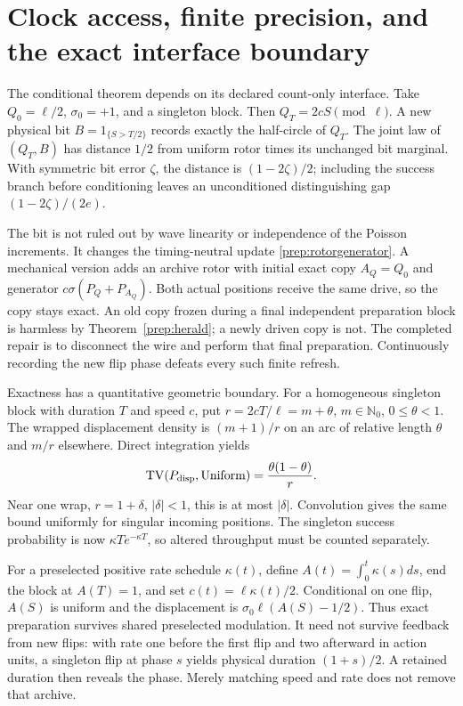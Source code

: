 \documentclass[11pt,oneside,openany]{book}
\theoremstyle{definition}
\theoremstyle{remark}\newtheorem{remark}[theorem]{Remark}
\begin{document}
\section{Clock access, finite precision, and the exact interface boundary}

The conditional theorem depends on its declared count-only interface.
Take $Q_0=\ell/2$, $\sigma_0=+1$, and a singleton block. Then
$Q_T=2cS\pmod\ell$. A new physical bit
$B=1_{\{S>T/2\}}$ records exactly the half-circle of $Q_T$.
The joint law of $(Q_T,B)$ has distance $1/2$ from uniform rotor
times its unchanged bit marginal. With symmetric bit error $\zeta$,
the distance is $(1-2\zeta)/2$; including the success branch before
conditioning leaves an unconditioned distinguishing gap
$(1-2\zeta)/(2e)$.

The bit is not ruled out by wave linearity or independence of the Poisson
increments. It changes the timing-neutral update
\eqref{prep:rotorgenerator}. A mechanical version adds an archive rotor
with initial exact copy $A_Q=Q_0$ and generator
$c\sigma(P_Q+P_{A_Q})$. Both actual positions receive the same drive,
so the copy stays exact. An old copy frozen during a final independent
preparation block is harmless by Theorem~\ref{prep:herald}; a newly driven
copy is not. The completed repair is to disconnect the wire and perform
that final preparation. Continuously recording the new flip phase defeats
every such finite refresh.

Exactness has a quantitative geometric boundary. For a homogeneous
singleton block with duration $T$ and speed $c$, put
$r=2cT/\ell=m+\theta$, $m\in\mathbb N_0$, $0\le\theta<1$.
The wrapped displacement density is $(m+1)/r$ on an arc of relative length
$\theta$ and $m/r$ elsewhere. Direct integration yields
\begin{equation}
 \operatorname{TV}(P_{\rm disp},\mathrm{Uniform})
       =\frac{\theta(1-\theta)}r.
 \label{prep:wraperror}
\end{equation}
Near one wrap, $r=1+\delta$, $|\delta|<1$, this is at most $|\delta|$.
Convolution gives the same bound uniformly for singular incoming positions.
The singleton success probability is now $\kappa Te^{-\kappa T}$,
so altered throughput must be counted separately.

For a preselected positive rate schedule $\kappa(t)$, define
$A(t)=\int_0^t\kappa(s)ds$, end the block at $A(T)=1$, and set
$c(t)=\ell\kappa(t)/2$. Conditional on one flip, $A(S)$ is uniform and
the displacement is $\sigma_0\ell(A(S)-1/2)$.
Thus exact preparation survives shared preselected modulation.
It need not survive feedback from new flips: with rate one before the
first flip and two afterward in action units, a singleton flip at phase
$s$ yields physical duration $(1+s)/2$. A retained duration then reveals
the phase. Merely matching speed and rate does not remove that archive.
\end{document}
